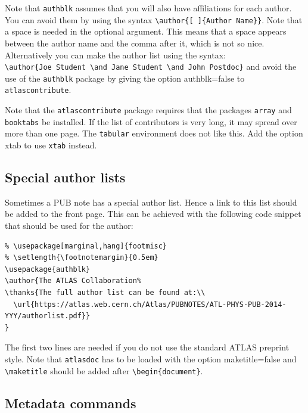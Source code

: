 \documentclass[UKenglish]{latex/atlasdoc}
\newcommand{\Macro}[1]{\texttt{\textbackslash #1}\xspace}
\newcommand{\Option}[1]{\textsf{#1}\xspace}
\newcommand{\Package}[1]{\texttt{#1}\xspace}
\begin{document}
Note that \Package{authblk} assumes that you will also have affiliations for each author.
You can avoid them by using the syntax \verb|\author{[ ]{Author Name}}|.
Note that a space is needed in the optional argument.
This means that a space appears between the author name and the comma after it, which is not so nice.
Alternatively you can make the author list using the syntax:\\
\verb|\author{Joe Student \and Jane Student \and John Postdoc}| and avoid the use of the
\Package{authblk} package by giving the option \Option{authblk=false} to \Package{atlascontribute}.

Note that the \Package{atlascontribute} package requires that the packages 
\Package{array} and \Package{booktabs} be installed.
If the list of contributors is very long, it may spread over more than one page.
The \Package{tabular} environment does not like this.
Add the option \Option{xtab} to use \Package{xtab} instead.


\subsection{Special author lists}

Sometimes a PUB note has a special author list.
Hence a link to this list should be added to the front page.
This can be achieved with the following code snippet that should be used for the author:
\begin{verbatim}
% \usepackage[marginal,hang]{footmisc}
% \setlength{\footnotemargin}{0.5em}
\usepackage{authblk}
\author{The ATLAS Collaboration%
\thanks{The full author list can be found at:\\
  \url{https://atlas.web.cern.ch/Atlas/PUBNOTES/ATL-PHYS-PUB-2014-YYY/authorlist.pdf}}
}
\end{verbatim}

The first two lines are needed if you do not use the standard ATLAS preprint style.
Note that \Package{atlasdoc} has to be loaded with the option \Option{maketitle=false}
and \Macro{maketitle} should be added after \verb|\begin{document}|.


\subsection{Metadata commands}
\end{document}
